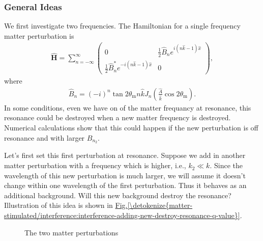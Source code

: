 \documentclass[letterpaper,12pt,english]{sphinxmanual}
\begin{document}
\subsubsection{General Ideas}
\label{\detokenize{matter-stimulated/interference:general-ideas}}
We first investigate two frequencies. The Hamiltonian for a single frequency matter perturbation is
\begin{equation*}
\begin{split}\hat{\mathbf{H}} = \sum_{n=-\infty}^{\infty} \begin{pmatrix}
0 & \frac{1}{2} \hat B_n e^{i(n \hat k - 1)\hat x} \\
\frac{1}{2} \hat B_n^* e^{-i(n \hat k - 1)\hat x} & 0
\end{pmatrix},\end{split}
\end{equation*}
where
\begin{equation*}
\begin{split}\hat B_n = (-i)^n \tan 2\theta_{\mathrm{m}} n \hat k  J_n (\frac{\hat A}{\hat k} \cos 2\theta_{\mathrm{m}}).\end{split}
\end{equation*}
In some conditions, even we have on of the matter frequancy at resonance, this resonance could be destroyed when a new matter frequency is destroyed. Numerical calculations show that this could happen if the new perturbation is off resonance and with larger \(B_{n_2}\).

Let's first set this first perturbation at resonance. Suppose we add in another matter perturbation with a frequency which is higher, i.e., \(k_2\ll k\). Since the wavelength of this new perturbation is much larger, we will assume it doesn't change within one wavelength of the first perturbation. Thus it behaves as an additional background. Will this new background destroy the resonance? Illustration of this idea is shown in \hyperref[\detokenize{matter-stimulated/interference:interference-adding-new-destroy-resonance-q-value}]{Fig.\@ \ref{\detokenize{matter-stimulated/interference:interference-adding-new-destroy-resonance-q-value}}}.
\begin{figure}[htbp]
\centering
\capstart

\noindent{}
\caption{The two matter perturbations}\label{\detokenize{matter-stimulated/interference:interference-adding-new-destroy-resonance-q-value}}\label{\detokenize{matter-stimulated/interference:id1}}\end{figure}
\end{document}

